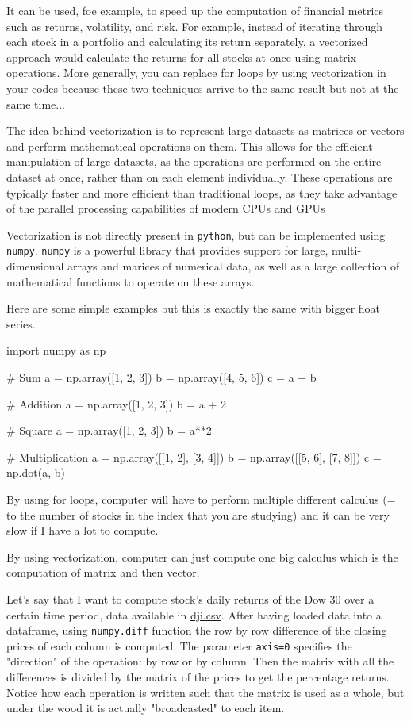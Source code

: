 It can be used, foe example, to speed up the computation of financial metrics such as returns, volatility, and risk. For example, instead of iterating through each stock in a portfolio and calculating its return separately, a vectorized approach would calculate the returns for all stocks at once using matrix operations. 
More generally, you can replace for loops by using vectorization in your codes because these two techniques arrive to the same result but not at the same time...

The idea behind vectorization is to represent large datasets as matrices or vectors and perform mathematical operations on them. This allows for the efficient manipulation of large datasets, as the operations are performed on the entire dataset at once, rather than on each element individually. These operations are typically faster and more efficient than traditional loops, as they take advantage of the parallel processing capabilities of modern CPUs and GPUs

Vectorization is not directly present in \texttt{python}, but can be implemented using \texttt{numpy}.
\texttt{numpy} is a powerful library that provides support for large, multi-dimensional arrays and marices of numerical data, as well as a large collection of mathematical functions to operate on these arrays.

Here are some simple examples but this is exactly the same with bigger float series.

\begin{ipython}
import numpy as np

# Sum
a = np.array([1, 2, 3])
b = np.array([4, 5, 6])
c = a + b

# Addition
a = np.array([1, 2, 3])
b = a + 2

# Square
a = np.array([1, 2, 3])
b = a**2

# Multiplication
a = np.array([[1, 2], [3, 4]])
b = np.array([[5, 6], [7, 8]])
c = np.dot(a, b)
\end{ipython}

By using for loops, computer will have to perform multiple different calculus (= to the number of stocks in the index that you are studying) and it can be very slow if I have a lot to compute.

By using vectorization, computer can just compute one big calculus which is the computation of matrix and then vector.

Let’s say that I want to compute stock’s daily returns of the Dow 30 over a certain time period, data available in \href{https://raw.githubusercontent.com/matteosan1/finance_course/develop/input_files/dji.csv}{dji.csv}.
After having loaded data into a dataframe, using \texttt{numpy.diff} function the row by row difference of the closing prices of each column is computed. The parameter \texttt{axis=0} specifies the "direction" of the operation: by row or by column. Then the matrix with all the differences is divided by the matrix of the prices to get the percentage returns.
Notice how each operation is written such that the matrix is used as a whole, but under the wood it is actually "broadcasted" to each item.

